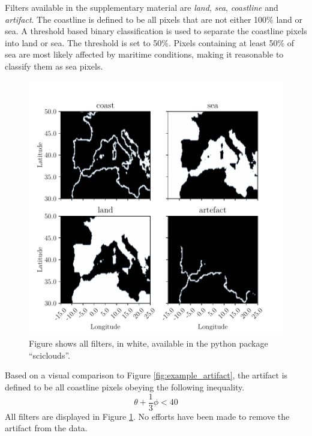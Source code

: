 Filters available in the supplementary material are \textit{land}, \textit{sea}, \textit{coastline} and \textit{artifact}. The coastline is defined to be all pixels that are not either 100\% land or sea. A threshold based binary classification is used to separate the coastline pixels into land or sea. The threshold is set to 50\%. Pixels containing at least 50\% of sea are most likely affected by maritime conditions, making it reasonable to classify them as sea pixels.
\begin{figure}
    \centering
    \includegraphics{python_figs/filters.pdf}
    \caption{Figure shows all filters, in white, available in the python package ``sciclouds''.}
    \label{fig:filters_subplot}
\end{figure}

Based on a visual comparison to Figure \ref{fig:example_artifact}, the artifact is defined to be all coastline pixels obeying the following inequality.
\begin{equation} \label{eq:artifact_condition}
    \theta + \frac{1}{3}\phi < 40
\end{equation}
All filters are displayed in Figure \ref{fig:filters_subplot}. 
No efforts have been made to remove the artifact from the data. 

